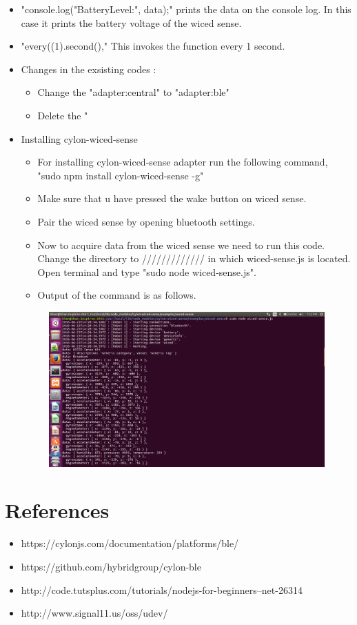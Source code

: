 \documentclass[11pt,a4paper]{article}
\begin{document}
\begin{itemize}
     \item "console.log("BatteryLevel:", data);" prints the data on the console log. In this case it prints the battery voltage of the wiced sense.
     
     \item "every((1).second()," This invokes the function every 1 second.
	 \item Changes in the exsisting codes :
	  \begin{itemize}
	 \item Change the "adapter:central" to "adapter:ble"
	 \item Delete the "
	 \end{itemize}
	\newpage
	\item Installing cylon-wiced-sense
	 \begin{itemize}
	\item For installing cylon-wiced-sense adapter run the following command,\\
	"sudo npm install cylon-wiced-sense -g"
	\item Make sure that u have pressed the wake button on wiced sense.
	\item Pair the wiced sense by opening bluetooth settings.
	\item Now to acquire data from the wiced sense we need to run this code. Change the directory to ///////////// in which wiced-sense.js is located.
	Open terminal and type "sudo node wiced-sense.js".
	
	\item Output of the command is as follows.
	\end{itemize}
	\begin{figure}[h]
    \centering
	\includegraphics[scale=0.35]{ble-data.png}
	\end{figure}
    \end{itemize}
    
    
    \newpage
	\section{References}
	 \begin{itemize}
	 \item https://cylonjs.com/documentation/platforms/ble/
	     \item https://github.com/hybridgroup/cylon-ble
	         \item http://code.tutsplus.com/tutorials/nodejs-for-beginners--net-26314
	         \item http://www.signal11.us/oss/udev/
	     \end{itemize}
\end{document}
